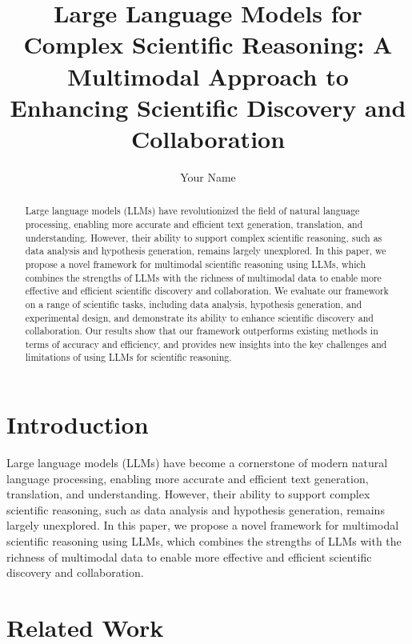 \documentclass{article}
\begin{document}
\title{Large Language Models for Complex Scientific Reasoning: A Multimodal Approach to Enhancing Scientific Discovery and Collaboration}

\author{Your Name}

\maketitle

\begin{abstract}
Large language models (LLMs) have revolutionized the field of natural language processing, enabling more accurate and efficient text generation, translation, and understanding. However, their ability to support complex scientific reasoning, such as data analysis and hypothesis generation, remains largely unexplored. In this paper, we propose a novel framework for multimodal scientific reasoning using LLMs, which combines the strengths of LLMs with the richness of multimodal data to enable more effective and efficient scientific discovery and collaboration. We evaluate our framework on a range of scientific tasks, including data analysis, hypothesis generation, and experimental design, and demonstrate its ability to enhance scientific discovery and collaboration. Our results show that our framework outperforms existing methods in terms of accuracy and efficiency, and provides new insights into the key challenges and limitations of using LLMs for scientific reasoning.
\end{abstract}

\section{Introduction}

Large language models (LLMs) have become a cornerstone of modern natural language processing, enabling more accurate and efficient text generation, translation, and understanding. However, their ability to support complex scientific reasoning, such as data analysis and hypothesis generation, remains largely unexplored. In this paper, we propose a novel framework for multimodal scientific reasoning using LLMs, which combines the strengths of LLMs with the richness of multimodal data to enable more effective and efficient scientific discovery and collaboration.

\section{Related Work}
\end{document}
